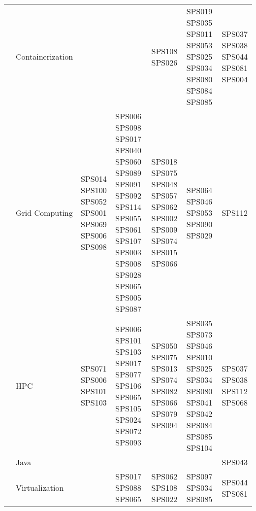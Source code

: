 \begin{table}[htbp]
\begin{tabularx}{\textwidth}{p{0.8cm}p{2.5cm}>{\raggedright\arraybackslash}X>{\raggedright\arraybackslash}X>{\raggedright\arraybackslash}X>{\raggedright\arraybackslash}X>{\raggedright\arraybackslash}X}
		\addlinespace[0.3em]
		                                      & Containerization        &                                                         &                                                                                                                               & SPS108 SPS026                                                                              & SPS019 SPS035 SPS011 SPS053 SPS025 SPS034 SPS080 SPS084 SPS085                      & SPS037 SPS038 SPS044 SPS081 SPS004 \\
		\addlinespace[0.3em]
		                                      & Grid Computing          & SPS014 SPS100 SPS052 SPS001 SPS069 SPS006 SPS098        & SPS006 SPS098 SPS017 SPS040 SPS060 SPS089 SPS091 SPS092 SPS114 SPS055 SPS061 SPS107 SPS003 SPS008 SPS028 SPS065 SPS005 SPS087 & SPS018 SPS075 SPS048 SPS057 SPS062 SPS002 SPS009 SPS074 SPS015 SPS066                      & SPS064 SPS046 SPS053 SPS090 SPS029                                                  & SPS112                             \\
		\addlinespace[0.3em]
		                                      & HPC                     & SPS071 SPS006 SPS101 SPS103                             & SPS006 SPS101 SPS103 SPS017 SPS077 SPS106 SPS065 SPS105 SPS024 SPS072 SPS093                                                  & SPS050 SPS075 SPS013 SPS074 SPS082 SPS066 SPS079 SPS094                                    & SPS035 SPS073 SPS046 SPS010 SPS025 SPS034 SPS080 SPS041 SPS042 SPS084 SPS085 SPS104 & SPS037 SPS038 SPS112 SPS068        \\
		\addlinespace[0.3em]
		                                      & Java                    &                                                         &                                                                                                                               &                                                                                            &                                                                                     & SPS043                             \\
		\addlinespace[0.3em]
		                                      & Virtualization          &                                                         & SPS017 SPS088 SPS065                                                                                                          & SPS062 SPS108 SPS022                                                                       & SPS097 SPS034 SPS085                                                                & SPS044 SPS081                      \\

\end{tabularx}
\end{table}
